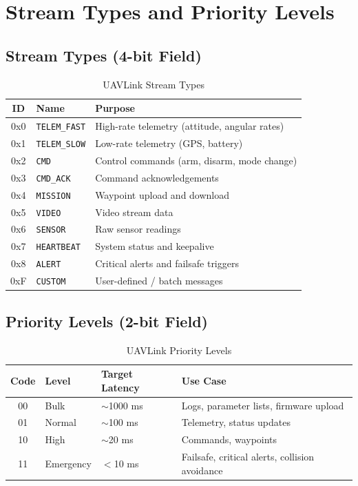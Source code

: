 \documentclass[11pt,a4paper]{article}
\begin{document}
\section{Stream Types and Priority Levels}

\subsection{Stream Types (4-bit Field)}
\label{sec:streams}

\begin{table}[H]
\centering
\caption{UAVLink Stream Types}
\begin{tabular}{@{}cll@{}}
\toprule
\textbf{ID} & \textbf{Name} & \textbf{Purpose} \\
\midrule
0x0 & \texttt{TELEM\_FAST}  & High-rate telemetry (attitude, angular rates) \\
0x1 & \texttt{TELEM\_SLOW}  & Low-rate telemetry (GPS, battery) \\
0x2 & \texttt{CMD}          & Control commands (arm, disarm, mode change) \\
0x3 & \texttt{CMD\_ACK}     & Command acknowledgements \\
0x4 & \texttt{MISSION}      & Waypoint upload and download \\
0x5 & \texttt{VIDEO}        & Video stream data \\
0x6 & \texttt{SENSOR}       & Raw sensor readings \\
0x7 & \texttt{HEARTBEAT}    & System status and keepalive \\
0x8 & \texttt{ALERT}        & Critical alerts and failsafe triggers \\
0xF & \texttt{CUSTOM}       & User-defined / batch messages \\
\bottomrule
\end{tabular}
\end{table}

\subsection{Priority Levels (2-bit Field)}
\label{sec:priority}

\begin{table}[H]
\centering
\caption{UAVLink Priority Levels}
\begin{tabular}{@{}clll@{}}
\toprule
\textbf{Code} & \textbf{Level} & \textbf{Target Latency} & \textbf{Use Case} \\
\midrule
00 & Bulk      & $\sim$1000 ms & Logs, parameter lists, firmware upload \\
01 & Normal    & $\sim$100 ms  & Telemetry, status updates \\
10 & High      & $\sim$20 ms   & Commands, waypoints \\
11 & Emergency & $<$10 ms      & Failsafe, critical alerts, collision avoidance \\
\bottomrule
\end{tabular}
\end{table}
\end{document}
